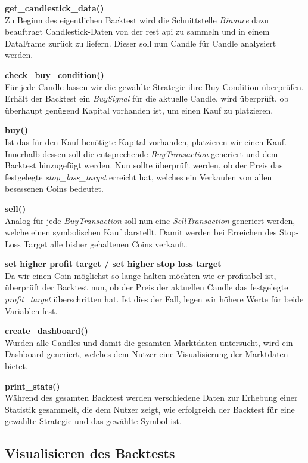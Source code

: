 \documentclass[oneside]{ausarbeitung}
\begin{document}
\textbf{get\_candlestick\_data()} \\
Zu Beginn des eigentlichen Backtest wird die Schnittstelle \textit{Binance} dazu beauftragt Candlestick-Daten von der \ac{rest} \ac{api} zu sammeln und in einem DataFrame zurück zu liefern. Dieser soll nun Candle für Candle analysiert werden.

\textbf{check\_buy\_condition()} \\
Für jede Candle lassen wir die gewählte Strategie ihre Buy Condition überprüfen. Erhält der Backtest ein \textit{BuySignal} für die aktuelle Candle, wird überprüft, ob überhaupt genügend Kapital vorhanden ist, um einen Kauf zu platzieren.

\textbf{buy()} \\
Ist das für den Kauf benötigte Kapital vorhanden, platzieren wir einen Kauf. Innerhalb dessen soll die entsprechende \textit{BuyTransaction} generiert und dem Backtest hinzugefügt werden. Nun sollte überprüft werden, ob der Preis das festgelegte \textit{stop\_loss\_target} erreicht hat, welches ein Verkaufen von allen besessenen Coins bedeutet.

\textbf{sell()} \\
Analog für jede \textit{BuyTransaction} soll nun eine \textit{SellTransaction} generiert werden, welche einen symbolischen Kauf darstellt. Damit werden bei Erreichen des Stop-Loss Target alle bisher gehaltenen Coins verkauft.

\textbf{set higher profit target / set higher stop loss target} \\
Da wir einen Coin möglichst so lange halten möchten wie er profitabel ist, überprüft der Backtest nun, ob der Preis der aktuellen Candle das festgelegte \textit{profit\_target} überschritten hat. Ist dies der Fall, legen wir höhere Werte für beide Variablen fest.

\textbf{create\_dashboard()} \\
Wurden alle Candles und damit die gesamten Marktdaten untersucht, wird ein Dashboard generiert, welches dem Nutzer eine Visualisierung der Marktdaten bietet. 

\textbf{print\_stats()} \\
Während des gesamten Backtest werden verschiedene Daten zur Erhebung einer Statistik gesammelt, die dem Nutzer zeigt, wie erfolgreich der Backtest für eine gewählte Strategie und das gewählte Symbol ist.

\subsection{Visualisieren des Backtests}
\label{sub:visualisieren_des_backtests}
\end{document}
